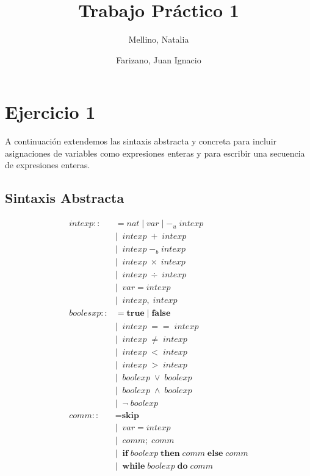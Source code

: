 \documentclass[11pt]{article}
\title{Trabajo Práctico 1}
\author{Mellino, Natalia \and Farizano, Juan Ignacio}
\date{}
\begin{document}
\maketitle


\section*{Ejercicio 1}
A continuación extendemos las sintaxis abstracta y concreta para incluir asignaciones
de variables como expresiones enteras y para escribir una secuencia de expresiones enteras.

\subsection*{Sintaxis Abstracta}

\begin{align*}
intexp ::&= nat \; | \; var \; | \; -_u \; intexp \\
         &| \;\; intexp \; +  \; intexp \\
         &| \;\; intexp \; -_b  \; intexp \\
         &| \;\; intexp \; \times  \; intexp \\
         &| \;\; intexp \; \div  \; intexp \\
         &| \;\; var = intexp \\
         &| \;\; intexp, \; intexp \\
boolesxp ::&= \textbf{true} \; | \; \textbf{false} \\
           &| \;\; intexp \; ==  \; intexp \\
           &| \;\; intexp \; \neq  \; intexp \\
           &| \;\; intexp \; <  \; intexp \\
           &| \;\; intexp \; >  \; intexp \\
           &| \;\; boolexp \; \lor  \; boolexp \\
           &| \;\; boolexp \; \land  \; boolexp \\
           &| \;\; \neg \; boolexp \\
comm ::&= \textbf{skip} \\
       &| \;\; var = intexp \\
       &| \;\; comm; \; comm \\
       &| \;\; \textbf{if} \; boolexp \; \textbf{then} \; comm \; \textbf{else} \; comm \\
       &| \; \; \textbf{while} \; boolexp \; \textbf{do} \; comm
\end{align*}
\end{document}
